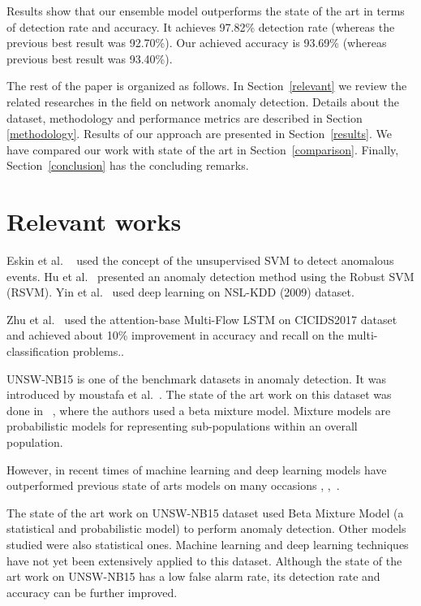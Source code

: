 \documentclass[14pt, conference]{IEEEtran}
\begin{document}
Results show that our ensemble model outperforms the state of the art \cite{moustafa2018anomaly} in terms of detection rate and accuracy. It achieves 97.82\% detection rate  (whereas the previous best result was 92.70\%). Our achieved accuracy is 93.69\% (whereas previous best result was 93.40\%).

The rest of the paper is organized as follows. In Section~\ref{relevant} we review the related researches in the field on network anomaly detection. Details about the dataset, methodology and performance metrics are described in Section \ref{methodology}. Results of our approach are presented in Section~\ref{results}. We have compared our work with state of the art in Section~\ref{comparison}. Finally, Section~\ref{conclusion} has the concluding remarks.

%
\section{Relevant works \label{relevant}}
Eskin et al. ~\cite{eskin2002geometric} used the concept of the unsupervised SVM to detect anomalous events. 
% 
Hu et al.~\cite{hu2003robust} presented an anomaly detection method using the Robust SVM (RSVM).  Yin et al.~\cite{yin2017deep} used deep learning on NSL-KDD (2009) dataset.

Zhu et al.~\cite{zhu2018deep} used the attention-base Multi-Flow LSTM on CICIDS2017 dataset and achieved about 10\% improvement in accuracy and recall on the multi-classification problems..

 UNSW-NB15 is one of the benchmark datasets in anomaly detection. It was introduced by moustafa et al.~\cite{moustafa2015unsw}. The state of the art work on this dataset was done in ~\cite{moustafa2018anomaly}, where the authors  used a beta mixture model. Mixture models are probabilistic models for representing sub-populations within an overall population. 

However, in recent times of machine learning and deep learning models have outperformed previous state of arts models on many occasions \cite{8264962}, \cite{7777224},~\cite{zhu2018deep}.

The state of the art work \cite{moustafa2018anomaly} on UNSW-NB15 dataset used Beta Mixture Model (a statistical and probabilistic model) to perform anomaly detection. Other models studied were also statistical ones. Machine learning and deep learning techniques have not yet been extensively applied to this dataset. Although the state of the art work on UNSW-NB15 has a low false alarm rate, its detection rate and accuracy can be further improved.
    
\end{document}
